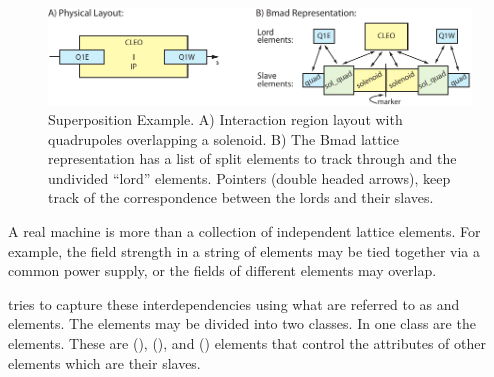 \begin{figure}[tb]
 \begin{center}
 \includegraphics[width=6.0in]{superimpose-ip.pdf}
 \caption[Superposition example.]
 {
Superposition Example. A) Interaction region layout
with quadrupoles overlapping a solenoid. B) The Bmad lattice
representation has a list of split elements to track through and the
undivided ``lord'' elements. Pointers (double headed arrows), keep
track of the correspondence between the lords and their slaves.
 }
 \label{f:super.ip}
 \end{center}
 \end{figure}


A real machine is more than a collection of independent lattice
elements. For example, the field strength in a string of elements may
be tied together via a common power supply, or the fields of different
elements may overlap.

\bmad tries to capture these interdependencies using what are referred
to as  and  elements. The  elements may be
divided into two classes. In one class are the 
elements.  These are  (), 
(), and  () elements that
control the attributes of other elements which are their slaves.

